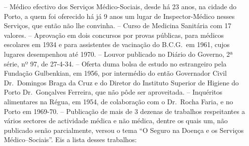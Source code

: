 \documentclass[9pt]{article}
\begin{document}
{\par
-- Médico efectivo dos Serviços Médico-Sociais, desde há 23 anos, na cidade do Porto, a
quem foi oferecido há já 9 anos um lugar de Inspector-Médico nesses Serviços, que então não lhe convinha.
\newskip
 -- Curso de Medicina Sanitária com 17 valores.
\newskip
 -- Aprova\-ção em dois concursos por provas públicas, para médicos escolares em 1934 e para assistentes de vacina\-ção do B.C.G.\ em 1961, cujos lugares desempenhou até 1970.
\newskip
 -- Louvor publicado no Diário do Governo, 2ª série, nº 97, de 27-4-34.
\newskip
 -- Oferta duma bolsa de estudo no estrangeiro pela Funda\-ção Gulbenkian, em 1956, por intermédio do então Governador Civil Dr.\ Domingos Braga da Cruz e do Diretor do Instituto Superior de Higiene do Porto Dr.\ Gonçalves Ferreira, que não pôde ser aproveitada.
\newskip
 -- Inquéritos alimentares na Régua, em 1954, de colabora\-ção com o Dr.\ Rocha Faria, e no Porto em 1969-70.
\newskip
 -- Publica\-ção de mais de 3 dezenas de traba\-lhos respeitantes a vários sectores de actividade médica e não médica, dentre os quais um, não publicado senão parcialmente, versou o tema “O Seguro na Doença e os Serviços Médico\---Sociais”. Eis a lista desses traba\-lhos:

\def\nos{n$^{\mbox{\tiny os}}$}

}
\end{document}

